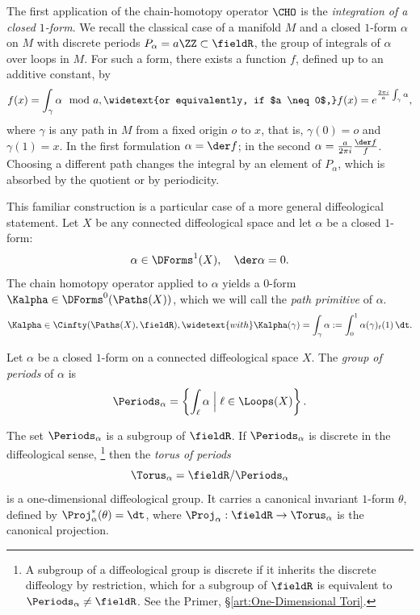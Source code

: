 \begin{article}
  \label{art: Integration of Closed 1-forms}
  The first application of the chain-homotopy operator $\CHO$ is the
  \emph{integration of a closed $1$-form}.
  We recall the classical case of a manifold $M$ and a closed $1$-form $\alpha$ on $M$
  with discrete periods $P_\alpha = a \ZZ \subset \fieldR$,
  the group of integrals of $\alpha$ over loops in $M$.
  For such a form,
  there exists a function $f$, defined up to an additive constant, by
  \[
    f(x) = \int_\gamma \alpha \mod a,
    \widetext{or equivalently, if $a \neq 0$,}
    f(x) = e^{\frac{2\pi i}{a}\int_\gamma \alpha},
    \]%
  where $\gamma$ is any path in $M$ from a fixed origin $o$ to $x$,
  that is, $\gamma(0) = o$ and $\gamma(1) = x$.
  In the first formulation $\alpha = \der f$;
  in the second $\alpha = \frac{a}{2\pi i}\frac{\der f}{f}$.
  Choosing a different path changes the integral by an element of $P_\alpha$,
  which is absorbed by the quotient or by periodicity.
  
  This familiar construction is a particular case of a more general
  diffeological statement.
  Let $X$ be any connected diffeological space and let $\alpha$ be a closed $1$-form:
  \[
    \alpha \in \DForms^1(X),
    \quad
    \der\alpha = 0.
    \]%
  The chain homotopy operator applied to $\alpha$ yields a $0$-form $\Kalpha \in \DForms^0(\Paths(X))$,
  which we will call the \emph{path primitive} of $\alpha$.
  \[
    \Kalpha \in \Cinfty(\Paths(X),\fieldR),
    \widetext{with}
    \Kalpha(\gamma) = \int_\gamma \alpha := \int_0^1 \alpha(\gamma)_t(1)\, \dt.
    \]%
  
  \begin{definition}
    Let $\alpha$ be a closed $1$-form on a connected diffeological space $X$.
    The \emph{group of periods} of $\alpha$ is
    \[
      \Periods_\alpha = \left\{ \int_\ell \alpha \;\Big|\; \ell \in \Loops(X) \right\}.
      \]%
  \end{definition}
  
  \begin{proposition}[1]
    The set $\Periods_\alpha$ is a subgroup of $\fieldR$.
    If $\Periods_\alpha$ is discrete in the diffeological sense,%
    \footnote{A subgroup of a diffeological group is discrete if it inherits the
    discrete diffeology by restriction,
    which for a subgroup of $\fieldR$ is equivalent to $\Periods_\alpha \neq \fieldR$.
    See the Primer, \S\ref{art:One-Dimensional Tori}.}
    then the \emph{torus of periods}
    \[
      \Torus_\alpha = \fieldR/\Periods_\alpha
      \]%
    is a one-dimensional diffeological group.
    It carries a canonical invariant $1$-form $\theta$,
    defined by $\Proj_\alpha^*(\theta) = \dt$,
    where $\Proj_\alpha: \fieldR \to \Torus_\alpha$ is the canonical projection.
  \end{proposition}
  

\end{article}
